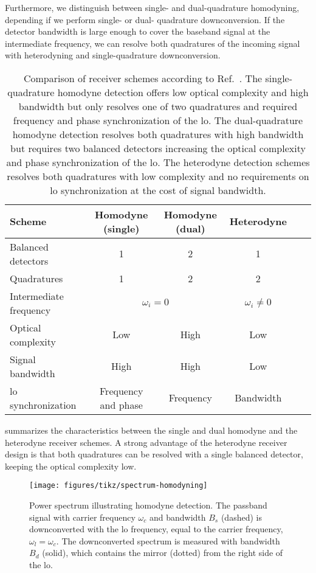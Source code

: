 Furthermore, we distinguish between single- and dual-quadrature homodyning, depending if we perform single- or dual- quadrature downconversion.
If the detector bandwidth is large enough to cover the baseband signal at the intermediate frequency, we can resolve both quadratures of the incoming signal with heterodyning and single-quadrature downconversion.
\begin{table}[htb]
  \centering
  \begin{tabular}{lccccc}
    \toprule
    Scheme & Homodyne (single) & Homodyne (dual) & Heterodyne \\
    \midrule
    Balanced detectors & \num{1} & \num{2} & \num{1} \\
    Quadratures & \num{1} & \num{2} & \num{2} \\
    Intermediate frequency & \multicolumn{2}{c}{$\omega_i=0$} & $\omega_i\neq 0$ \\
    Optical complexity & Low & High & Low \\
    Signal bandwidth & High & High & Low \\
    \gls{lo} synchronization & Frequency and phase & Frequency & Bandwidth \\
    \bottomrule
  \end{tabular}
  \caption{Comparison of receiver schemes according to Ref.~\cite{Brunner2017}. The single-quadrature homodyne detection offers low optical complexity and high bandwidth but only resolves one of two quadratures and required frequency and phase synchronization of the \gls{lo}. The dual-quadrature homodyne detection resolves both quadratures with high bandwidth but requires two balanced detectors increasing the optical complexity and phase synchronization of the \gls{lo}. The heterodyne detection schemes resolves both quadratures with low complexity and no requirements on \gls{lo} synchronization at the cost of signal bandwidth.}\label{tab:receivers}
\end{table}
 summarizes the characteristics between the single and dual homodyne and the heterodyne receiver schemes.
A strong advantage of the heterodyne receiver design is that both quadratures can be resolved with a single balanced detector, keeping the optical complexity low.

\begin{figure}[htb]
	\centering
	\texttt{[image: figures/tikz/spectrum-homodyning]}
	\caption{Power spectrum illustrating homodyne detection. The passband signal with carrier frequency $\omega_c$ and bandwidth $B_s$ (dashed) is downconverted with the \gls{lo} frequency, equal to the carrier frequency, $\omega_l=\omega_c$. The downconverted spectrum is measured with bandwidth $B_d$ (solid), which contains the mirror (dotted) from the right side of the \gls{lo}.}\label{fig:spectrum_homodyning}
\end{figure}

